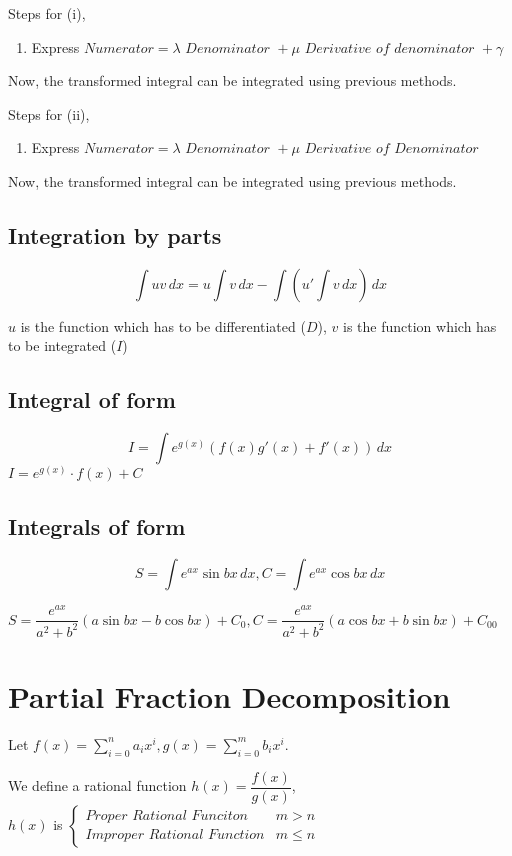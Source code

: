 \documentclass{article}
\begin{document}
Steps for (i),
\begin{enumerate}[1.]
    \item Express $\textit{Numerator}= \lambda \textit{ Denominator } + \mu \textit{ Derivative of denominator } + \gamma$
\end{enumerate}
Now, the transformed integral can be integrated using previous methods.


Steps for (ii),
\begin{enumerate}[1.]
    \item Express $\textit{Numerator}=\lambda \textit{ Denominator } + \mu \textit{ Derivative of Denominator}$
\end{enumerate}
Now, the transformed integral can be integrated using previous methods.
\subsection{Integration by parts}

$$\int uv \, dx = u \int v \, dx - \int \left(u' \int v \, dx\right) \, dx$$


$u$ is the function which has to be differentiated ($D$), $v$ is the function which has to be integrated ($I$)

\subsection{Integral of form }
$$I=\int e^{g(x)} \left(f(x)g'(x)+f'(x)\right) \, dx$$
$I=e^{g(x)} \cdot f(x) +C$

\subsection{Integrals of form }
$$S=\int e^{ax} \sin bx \, dx, C = \int e^{ax} \cos bx \, dx$$

$S=\dfrac{e^{ax}}{a^2+b^2}\left(a \sin bx -b \cos bx\right)+C_{0}, C=\dfrac{e^{ax}}{a^2+b^2}\left(a \cos bx + b \sin bx\right) + C_{00}$

\section{Partial Fraction Decomposition}
Let $f(x)=\displaystyle\sum_{i=0}^{n}a_{i}x^i, g(x)=\displaystyle\sum_{i=0}^{m} b_{i}x^i$.

We define a rational function $h(x)=\dfrac{f(x)}{g(x)}$, \\ $h(x)$ is $\begin{cases}
        \textit{Proper Rational Funciton}   & m>n     \\
        \textit{Improper Rational Function} & m \le n
    \end{cases}$
\end{document}
